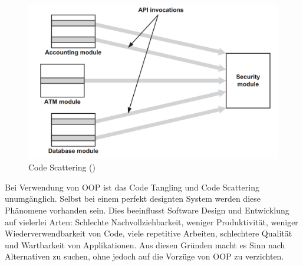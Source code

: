 \begin{figure}[H]
	\centering
		\includegraphics[scale=0.5]{bilder/motivationsCodeScattering}
	\caption{Code Scattering (\cite[p~54]{laddad:aspectj})}
	\label{fig:motivationcs}
\end{figure}

Bei Verwendung von OOP ist das Code Tangling und Code Scattering unumgänglich. Selbst bei einem perfekt designten System werden diese Phänomene vorhanden sein. Dies beeinflusst Software Design und Entwicklung auf vielerlei Arten: Schlechte Nachvollziehbarkeit, weniger Produktivität, weniger Wiederverwendbarkeit von Code, viele repetitive Arbeiten, schlechtere Qualität und Wartbarkeit von Applikationen. Aus diesen Gründen macht es Sinn nach Alternativen zu suchen, ohne jedoch auf die Vorzüge von OOP zu verzichten.


